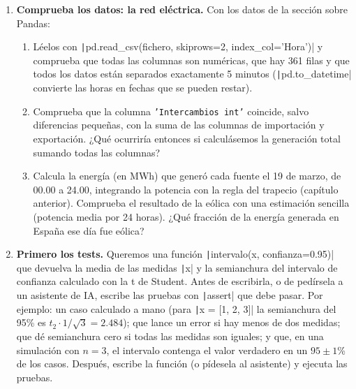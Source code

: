 \begin{enumerate}
\item \label{ej:red_electrica} \textbf{Comprueba los datos: la red eléctrica.} Con los datos de la sección sobre Pandas:
\begin{enumerate}
\item Léelos con \texttt|pd.read_csv(fichero, skiprows=2, index_col='Hora')| y comprueba que todas las columnas son numéricas, que hay 361 filas y que todos los datos están separados exactamente 5 minutos (\texttt|pd.to_datetime| convierte las horas en fechas que se pueden restar).
\item Comprueba que la columna \texttt{'Intercambios int'} coincide, salvo diferencias pequeñas, con la suma de las columnas de importación y exportación. ¿Qué ocurriría entonces si calculásemos la generación total sumando todas las columnas?
\item Calcula la energía (en MWh) que generó cada fuente el 19 de marzo, de 00.00 a 24.00, integrando la potencia con la regla del trapecio (capítulo anterior). Comprueba el resultado de la eólica con una estimación sencilla (potencia media por 24 horas). ¿Qué fracción de la energía generada en España ese día fue eólica?
\end{enumerate}

\item \label{ej:tests_ia} \textbf{Primero los tests.} Queremos una función \texttt|intervalo(x, confianza=0.95)| que devuelva la media de las medidas \texttt|x| y la semianchura del intervalo de confianza calculado con la t de Student. Antes de escribirla, o de pedírsela a un asistente de IA, escribe las pruebas con \texttt|assert| que debe pasar. Por ejemplo: un caso calculado a mano (para \texttt|x = [1, 2, 3]| la semianchura del 95\% es $t_{2}\cdot 1/\sqrt{3}=2.484$); que lance un error si hay menos de dos medidas; que dé semianchura cero si todas las medidas son iguales; y que, en una simulación con $n=3$, el intervalo contenga el valor verdadero en un $95\pm1$\% de los casos. Después, escribe la función (o pídesela al asistente) y ejecuta las pruebas.
\end{enumerate}

